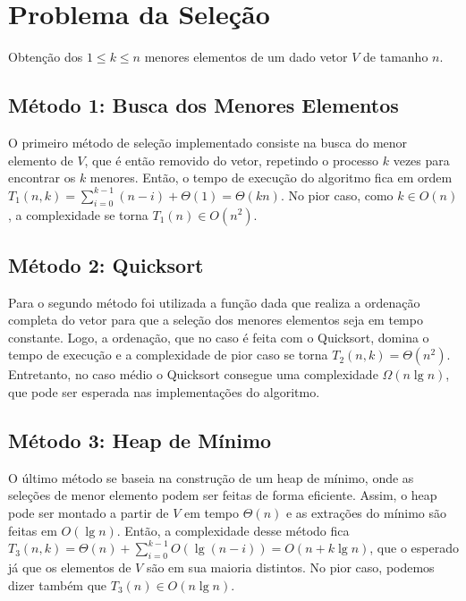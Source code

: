 \section{Problema da Seleção}

Obtenção dos $1 \leq k \leq n$ menores elementos de um dado vetor $V$ de tamanho $n$.

\subsection{Método 1: Busca dos Menores Elementos}

O primeiro método de seleção implementado consiste na busca do menor elemento de $V$, que é então removido do vetor, repetindo o processo $k$ vezes para encontrar os $k$ menores. Então, o tempo de execução do algoritmo fica em ordem $T_1(n, k) = \sum_{i = 0}^{k-1} (n - i) + \Theta(1) = \Theta(k n)$. No pior caso, como $k \in O(n)$, a complexidade se torna $T_1(n) \in O\left(n^2\right)$.

\subsection{Método 2: Quicksort}

Para o segundo método foi utilizada a função dada que realiza a ordenação completa do vetor para que a seleção dos menores elementos seja em tempo constante. Logo, a ordenação, que no caso é feita com o Quicksort, domina o tempo de execução e a complexidade de pior caso se torna $T_2(n, k) = \Theta\left(n^2\right)$. Entretanto, no caso médio o Quicksort consegue uma complexidade $\Omega(n \lg n)$, que pode ser esperada nas implementações do algoritmo.

\subsection{Método 3: Heap de Mínimo}

O último método se baseia na construção de um heap de mínimo, onde as seleções de menor elemento podem ser feitas de forma eficiente. Assim, o heap pode ser montado a partir de $V$ em tempo $\Theta(n)$ e as extrações do mínimo são feitas em $O(\lg n)$. Então, a complexidade desse método fica $T_3(n, k) = \Theta(n) + \sum_{i = 0}^{k - 1} O(\lg (n - i)) = O(n + k \lg n)$, que o esperado já que os elementos de $V$ são em sua maioria distintos. No pior caso, podemos dizer também que $T_3(n) \in O(n \lg n)$.
